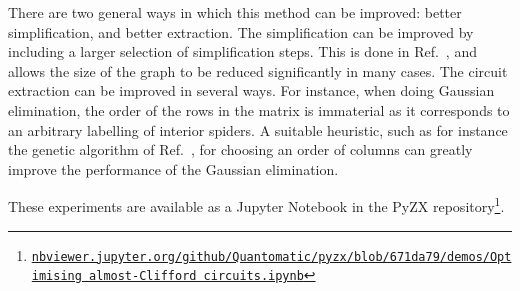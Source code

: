\documentclass[a4paper,onecolumn,superscriptaddress,11pt,accepted=2020-04-27]{quantumarticle}
\theoremstyle{definition}
\begin{document}

There are two general ways in which this method can be improved: better simplification, and better extraction. The simplification can be improved by including a larger selection of simplification steps. This is done in Ref.~\cite{zxtcount}, and allows the size of the graph to be reduced significantly in many cases. The circuit extraction can be improved in several ways. For instance, when doing Gaussian elimination, the order of the rows in the matrix is immaterial as it corresponds to an arbitrary labelling of interior spiders. A suitable heuristic, such as for instance the genetic algorithm of Ref.~\cite{kissinger2019cnot}, for choosing an order of columns can greatly improve the performance of the Gaussian elimination.


These experiments are available as a Jupyter Notebook in the PyZX repository\footnote{\href{https://nbviewer.jupyter.org/github/Quantomatic/pyzx/blob/671da79/demos/Optimising\%20almost-Clifford\%20circuits.ipynb}{\color{blue!80!black}\texttt{nbviewer.jupyter.org/github/Quantomatic/pyzx/blob/671da79/demos/Optimising almost-Clifford circuits.ipynb}}}.



\end{document}
